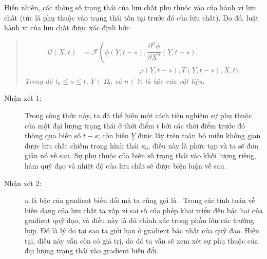 \documentclass[../../../main.tex]{subfiles}
\begin{document}
    Hiển nhiên, các thông số trạng thái của lưu chất phụ thuộc vào  của hành vi lưu chất (tức là phụ thuộc vào trạng thái tồn tại trước đó của lưu chất). Do đó, luật hành vi của lưu chất được xác định bởi:
    	\begin{quotation}
    			\begin{equation}
    				\begin{aligned}
    					\mathcal{Q}\left(\underline{X},t\right)&=\mathcal{F}\left(\underline{\phi}\left(\underline{Y},t-s\right),\dfrac{\partial^n\underline{\phi}}{\partial\underline{X}^n}\left(\underline{Y},t-s\right),\right.\\
					&\qquad\qquad\qquad\qquad\rho\left(\underline{Y},t-s\right),T\left(\underline{Y},t-s\right),\underline{X},t\bigg).
    				\end{aligned}
    			\end{equation}
    		\emph{Trong đó $t_0\leq s\leq t$, $\underline{Y}\in\Omega_0$ và $n\in\mathbb{N}$ là bậc của vật liệu.}
    	\end{quotation}
    \begin{description}
    	\item[Nhận xét 1:] Trong công thức này, ta đã thể hiện một cách tiên nghiệm sự phụ thuộc của một đại lượng trạng thái ở thời điểm $t$ bởi các thời điểm trước đó thông qua biến số $t-s$; còn biến $\underline{Y}$ được lấy trên toàn bộ miền không gian được lưu chất chiếm trong hình thái $\kappa_0$, điều này là phức tạp và ta sẽ đơn giản nó về sau. Sự phụ thuộc của biến số trạng thái vào khối lượng riêng, hàm quỹ đạo và nhiệt độ của lưu chất sẽ được biện luận về sau.
    	\item[Nhận xét 2:] $n$ là bậc của gradient biến đổi mà ta cũng gọi là . Trong các tính toán về biến dạng của lưu chất ta xấp xỉ sai số của phép khai triển đến bậc hai của gradient quỹ đạo, và điều này là đủ chính xác trong phần lớn các trường hợp. Đó là lý do tại sao ta giới hạn ở gradient bậc nhất của quỹ đạo. Hiện tại, điều này vẫn còn có giá trị, do đó ta vẫn sẽ xem xét sự phụ thuộc của đại lượng trạng thái vào gradient biến đổi.
    \end{description}
    
\end{document}
